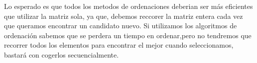 Lo esperado es que todos los metodos de ordenaciones deberian ser más eficientes que utilizar la matriz sola, ya que, debemos reccorer la matriz entera cada vez que queramos encontrar un candidato nuevo. Si utilizamos los algoritmos de ordenación sabemos que se perdera un tiempo en ordenar,pero no tendremos que recorrer todos los elementos para encontrar el mejor cuando seleccionamos, bastará con cogerlos secuencialmente.
